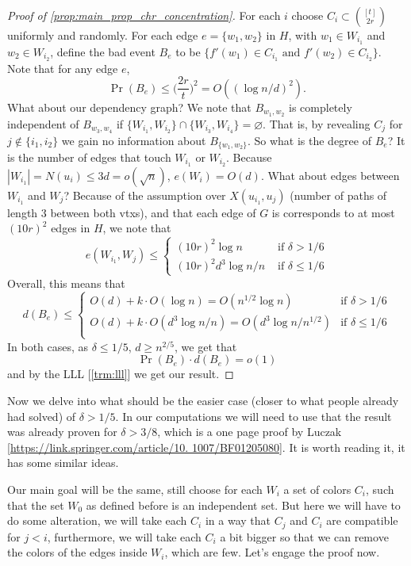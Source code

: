 \begin{proof}[Proof of \ref{prop:main_prop_chr_concentration}]
	For each $i$ choose $C_i \subset
	\binom{[t]}{2r}$ uniformly and randomly. For each edge $e = \{w_1,
	w_2\}$ in $H$, with $w_1 \in W_{i_1}$ and $w_2 \in W_{i_2}$,
	define the bad event $B_e$ to be $\{f'(w_1) \in C_{i_1} \text{ and }
	f'(w_2) \in C_{i_2}\}$. Note that for any edge $e$,
	\[
		\Pr(B_e) \leq \bigg(\frac{2r}{t}\bigg)^2 = O((\log n/ d)^2).
	\]
	What about our dependency graph? We note that $B_{w_1,w_2}$ is
	completely independent of $B_{w_3, w_4}$ if $\{W_{i_1}, W_{i_2}\}
	\cap \{W_{i_3}, W_{i_4}\} = \varnothing$.
	That is, by revealing $C_j$ for $j \not \in \{i_1, i_2\}$ we gain no
	information about $B_{\{w_1,w_2\}}$. So what is the degree of $B_e$?
	It is the number of
	edges that touch $W_{i_1}$ or $W_{i_2}$. Because $|W_{i_1}| = N(u_i)
	\leq 3d = o(\sqrt{n})$, $e(W_i) = O(d)$. What about edges between
	$W_{i_1}$ and $W_j$? Because of the assumption over $X(u_{i_1},
	u_j)$ (number of paths of length 3 between both vtxs), and that each
	edge of $G$ is corresponds to at most $(10r)^2$ edges in $H$, we note that
	\[
		e(W_{i_1}, W_j) \leq
		\begin{cases}
			(10r)^2 \log n      & \text{ if } \delta > 1/6    \\
			(10r)^2 d^3\log n/n & \text{ if } \delta \leq 1/6
		\end{cases}
	\]
	Overall, this means that
	\[
		d(B_e) \leq
		\begin{cases}
			O(d) + k \cdot O(\log n) = O(n^{1/2}\log n)               & \text{
			if } \delta > 1/6                                                  \\
			O(d) + k \cdot O(d^3 \log n / n) = O(d^3\log n / n^{1/2}) & \text{
			if } \delta \leq 1/6
			\\
		\end{cases}
	\]
	In both cases, as $\delta \leq 1/5$, $d \geq n^{2/5}$, we get that
	\[
		\Pr(B_e) \cdot d(B_e) = o(1)
	\]
	and by the LLL [\ref{trm:lll}] we get our result.
\end{proof}

Now we delve into what should be the easier case (closer to what
people already had solved) of $\delta > 1/5$.
In our computations we will need to use that the result was already
proven for $\delta > 3/8$, which is a one page proof
by Luczak [\url{https://link.springer.com/article/10.
1007/BF01205080}]. It is worth reading it, it has some similar ideas.

Our main goal will be the same, still choose for
each $W_i$ a set of colors $C_i$, such that the set $W_0$ as defined
before is an independent
set. But here we will have to do some alteration, we will take each
$C_i$ in a way that $C_j$ and $C_i$ are compatible for $j < i$,
furthermore, we will take each $C_i$ a bit bigger so that we can
remove the colors of the edges inside $W_i$, which are few.
Let's engage the proof now.

